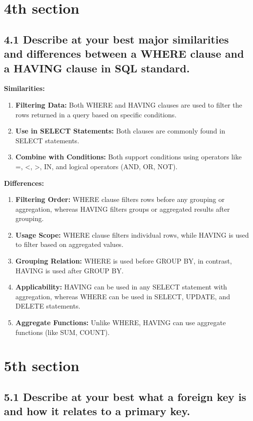 \documentclass[12pt]{article}
\begin{document}
\section{4th section}
\subsection*{4.1 Describe at your best major similarities and differences between a WHERE clause and a HAVING clause in SQL standard.}

\textbf{Similarities:}
\begin{enumerate}
    \item \textbf{Filtering Data:} Both WHERE and HAVING clauses are used to filter the rows returned in a query based on specific conditions.
    \item \textbf{Use in SELECT Statements:} Both clauses are commonly found in SELECT statements.
    \item \textbf{Combine with Conditions:} Both support conditions using operators like =, <, >, IN, and logical operators (AND, OR, NOT).
\end{enumerate}

\textbf{Differences:}
\begin{enumerate}
    \item \textbf{Filtering Order:} WHERE clause filters rows before any grouping or aggregation, whereas HAVING filters groups or aggregated results after grouping.
    \item \textbf{Usage Scope:} WHERE clause filters individual rows, while HAVING is used to filter based on aggregated values.
    \item \textbf{Grouping Relation:} WHERE is used before GROUP BY, in contrast, HAVING is used after GROUP BY.
    \item \textbf{Applicability:} HAVING can be used in any SELECT statement with aggregation, whereas WHERE can be used in SELECT, UPDATE, and DELETE statements.
    \item \textbf{Aggregate Functions:} Unlike WHERE, HAVING can use aggregate functions (like SUM, COUNT).
\end{enumerate}
\section{5th section}
\subsection*{5.1 Describe at your best what a foreign key is and how it relates to a primary key.}
\end{document}
